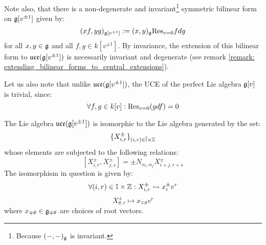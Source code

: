 \begin{example}
            Note also, that there is a non-degenerate and invariant\footnote{Because $(-, -)_{\mathfrak{g}}$ is invariant.} symmetric bilinear form on $\mathfrak{g}[v^{\pm 1}]$ given by:
                $$(xf, yg)_{\mathfrak{g}[v^{\pm 1}]} := (x, y)_{\mathfrak{g}} \mathrm{Res}_{v = 0} f dg$$
            for all $x, y \in \mathfrak{g}$ and all $f, g \in k[v^{\pm 1}]$. By invariance, the extension of this bilinear form to $\mathfrak{uce}(\mathfrak{g}[v^{\pm 1}])$ is necessarily invariant and degenerate (see remark \ref{remark: extending_bilinear_forms_to_central_extensions}).

            Let us also note that unlike $\mathfrak{uce}(\mathfrak{g}[v^{\pm 1}])$, the UCE of the perfect Lie algebra $\mathfrak{g}[v]$ is trivial, since:
                $$\forall f, g \in k[v]: \mathrm{Res}_{v = 0}(g df) = 0$$
        \end{example}

        \begin{lemma} \label{lemma: root_grading_for_affine_lie_algebras}
            The Lie algebra $\mathfrak{uce}(\mathfrak{g}[v^{\pm 1}])$ is isomorphic to the Lie algebra generated by the set:
                $$\{ X_{i, r}^{\pm} \}_{(i, r) \in \hat{\simpleroots} \x \Z}$$
            whose elements are subjected to the following relations:
                $$[X_{i, r}^{\pm}, X_{j, s}^{\pm}] = \pm N_{\alpha_i, \alpha_j} X_{i + j, r + s}^{\pm}$$
            The isomorphism in question is given by:
                $$\forall (i, r) \in \simpleroots \x \Z: X_{i, r}^{\pm} \mapsto x_i^{\pm} v^r$$
                $$X_{\theta, r}^{\pm} \mapsto x_{\mp \theta} v^r$$
            where $x_{\mp \theta} \in \mathfrak{g}_{\mp \theta}$ are choices of root vectors.
        \end{lemma}

